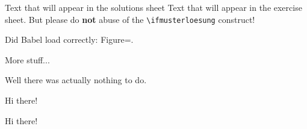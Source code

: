 \documentclass[11pt,a4paper]{article}
\begin{document}
\ifmusterloesung
Text that will appear in the solutions sheet
\else
Text that will appear in the exercise sheet.
But please do {\bf not} abuse of the \texttt{\textbackslash ifmusterloesung} construct!

Did Babel load correctly: Figure=\figurename.
\fi




More stuff...

\begin{solution}
  Well there was actually nothing to do.
\end{solution}


Hi there!


Hi there!
\end{document}
